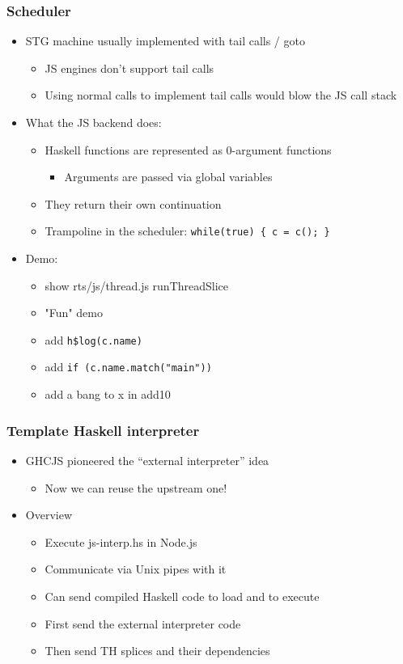\documentclass[aspectratio=169]{beamer}
\begin{document}
\begin{frame}
\frametitle{Scheduler}
  \begin{itemize}
    \item STG machine usually implemented with tail calls / goto
      \begin{itemize}
        \item JS engines don't support tail calls
        \item Using normal calls to implement tail calls would blow the JS call
          stack
      \end{itemize}

    \item What the JS backend does:
      \begin{itemize}
        \item Haskell functions are represented as 0-argument functions
          \begin{itemize}
            \item Arguments are passed via global variables
          \end{itemize}
        \item They \alert{return} their own continuation
        \item Trampoline in the scheduler: \texttt{while(true) \{ c = c(); \}}
      \end{itemize}
    \item Demo:
      \begin{itemize}
        \item show rts/js/thread.js runThreadSlice
        \item "Fun" demo
        \item add \texttt{h\$log(c.name)}
        \item add \texttt{if (c.name.match("main"))}
        \item add a bang to x in add10
      \end{itemize}
  \end{itemize}
\end{frame}

\begin{frame}
\frametitle{Template Haskell interpreter}
  \begin{itemize}
    \item GHCJS pioneered the “external interpreter” idea
      \begin{itemize}
        \item Now we can reuse the upstream one!
      \end{itemize}
    \item Overview
      \begin{itemize}
    \item Execute js-interp.hs in Node.js
    \item Communicate via Unix pipes with it
    \item Can send compiled Haskell code to load and to execute
    \item First send the external interpreter code
    \item Then send TH splices and their dependencies
      \end{itemize}
  \end{itemize}
\end{frame}
\end{document}
